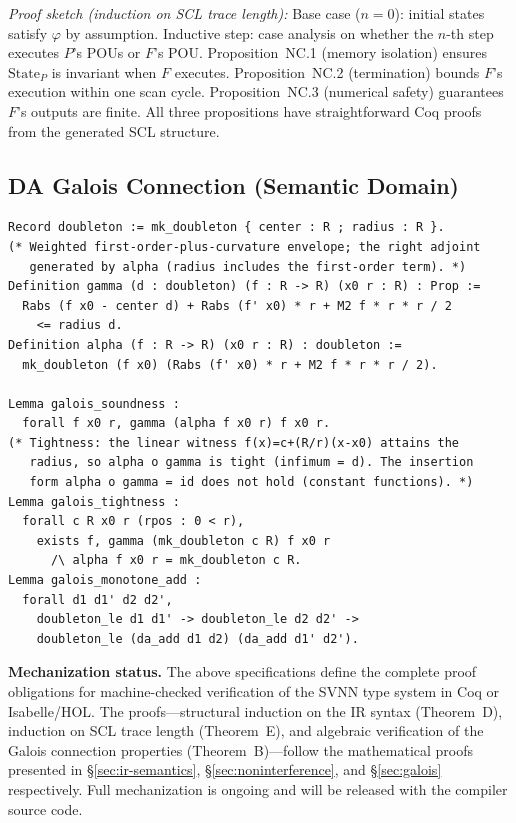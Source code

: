\textit{Proof sketch (induction on SCL trace length):}
Base case ($n=0$): initial states satisfy $\varphi$ by assumption.
Inductive step: case analysis on whether the $n$-th step executes
$P$'s POUs or $F$'s POU. Proposition~NC.1 (memory isolation) ensures
$\text{State}_P$ is invariant when $F$ executes. Proposition~NC.2
(termination) bounds $F$'s execution within one scan cycle.
Proposition~NC.3 (numerical safety) guarantees $F$'s outputs are
finite. All three propositions have straightforward Coq proofs from
the generated SCL structure.

\subsection{DA Galois Connection (Semantic Domain)}

\begin{verbatim}
Record doubleton := mk_doubleton { center : R ; radius : R }.
(* Weighted first-order-plus-curvature envelope; the right adjoint
   generated by alpha (radius includes the first-order term). *)
Definition gamma (d : doubleton) (f : R -> R) (x0 r : R) : Prop :=
  Rabs (f x0 - center d) + Rabs (f' x0) * r + M2 f * r * r / 2
    <= radius d.
Definition alpha (f : R -> R) (x0 r : R) : doubleton :=
  mk_doubleton (f x0) (Rabs (f' x0) * r + M2 f * r * r / 2).

Lemma galois_soundness :
  forall f x0 r, gamma (alpha f x0 r) f x0 r.
(* Tightness: the linear witness f(x)=c+(R/r)(x-x0) attains the
   radius, so alpha o gamma is tight (infimum = d). The insertion
   form alpha o gamma = id does not hold (constant functions). *)
Lemma galois_tightness :
  forall c R x0 r (rpos : 0 < r),
    exists f, gamma (mk_doubleton c R) f x0 r
      /\ alpha f x0 r = mk_doubleton c R.
Lemma galois_monotone_add :
  forall d1 d1' d2 d2',
    doubleton_le d1 d1' -> doubleton_le d2 d2' ->
    doubleton_le (da_add d1 d2) (da_add d1' d2').
\end{verbatim}

\vspace{4pt}
\noindent\textbf{Mechanization status.}
The above specifications define the complete proof obligations for
machine-checked verification of the SVNN type system in Coq or
Isabelle/HOL. The proofs---structural induction on the IR syntax
(Theorem~D), induction on SCL trace length (Theorem~E), and
algebraic verification of the Galois connection properties
(Theorem~B)---follow the mathematical proofs presented in
{\S}\ref{sec:ir-semantics}, {\S}\ref{sec:noninterference}, and
{\S}\ref{sec:galois} respectively. Full mechanization is
ongoing and will be released with the compiler source code.
